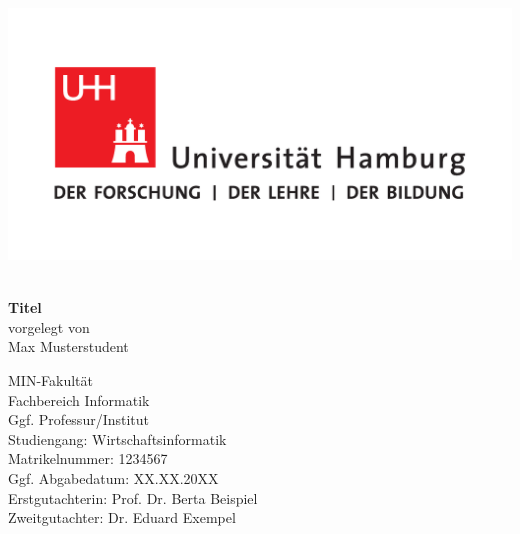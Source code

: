 \documentclass[11pt,a4paper]{scrbook}
\begin{document}
\frontmatter
{}
\begin{titlepage}
\includegraphics[scale=0.3]{UHH-Logo_2010_Farbe_CMYK.pdf}
\vspace*{2cm}
\Large
\begin{center}
              {\color{uhhred}\textbf{}}
\vspace*{2.0cm}\\
{\LARGE \textbf{Titel}}
\vspace*{2.0cm}\\
vorgelegt von
\vspace*{0.4cm}\\
Max Musterstudent
\end{center}
\vspace*{3.7cm}

\noindent
MIN-Fakultät \vspace*{0.25cm} \\
Fachbereich Informatik \vspace*{0.25cm} \\
Ggf. Professur/Institut \vspace*{0.25cm} \\       %
Studiengang: Wirtschaftsinformatik \vspace*{0.25cm} \\
Matrikelnummer: 1234567 \vspace*{0.5cm} \\
Ggf. Abgabedatum: XX.XX.20XX \vspace*{0.5cm} \\  %
Erstgutachterin: Prof. Dr. Berta Beispiel \vspace*{0.25cm} \\
Zweitgutachter: Dr. Eduard Exempel               %

\end{titlepage}
\end{document}
